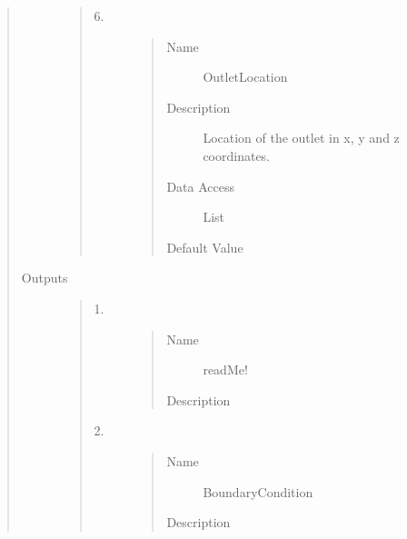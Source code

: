 \documentclass[letterpaper,10pt,english]{sphinxmanual}
\begin{document}
\begin{quote}
\begin{description}
\begin{quote}
\begin{description}
\begin{quote}
\begin{description}
\end{description}\end{quote}

\item[{6.}] \leavevmode\begin{quote}\begin{description}
\item[{Name}] \leavevmode
OutletLocation

\item[{Description}] \leavevmode
Location of the outlet in x, y and z coordinates.

\item[{Data Access}] \leavevmode
List

\item[{Default Value}] \leavevmode
{}

\end{description}\end{quote}

\end{description}\end{quote}

\item[{Outputs}] \leavevmode\begin{quote}\begin{description}
\item[{1.}] \leavevmode\begin{quote}\begin{description}
\item[{Name}] \leavevmode
readMe!

\item[{Description}] \leavevmode
{}

\end{description}\end{quote}

\item[{2.}] \leavevmode\begin{quote}\begin{description}
\item[{Name}] \leavevmode
BoundaryCondition

\item[{Description}] \leavevmode
{}


\end{description}
\end{quote}
\end{description}
\end{quote}
\end{description}
\end{quote}
\end{document}
